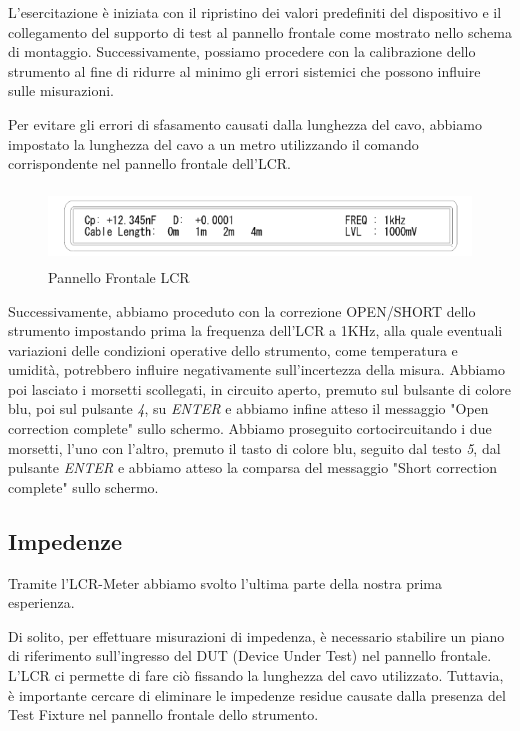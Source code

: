 L'esercitazione è iniziata con il ripristino dei valori predefiniti del dispositivo e il collegamento del supporto di test al pannello frontale come mostrato nello schema di montaggio. Successivamente, possiamo procedere con la calibrazione dello strumento al fine di ridurre al minimo gli errori sistemici che possono influire sulle misurazioni.

Per evitare gli errori di sfasamento causati dalla lunghezza del cavo, abbiamo impostato la lunghezza del cavo a un metro utilizzando il comando corrispondente nel pannello frontale dell'LCR.

\begin{figure}[ht]
    \centering
    \includegraphics[height=2cm]{media/pannello_frontale_LCR.png}
    \caption{Pannello Frontale LCR}
    \label{fig:pannello_frontale_LCR}
\end{figure}
\FloatBarrier

Successivamente, abbiamo proceduto con la correzione OPEN/SHORT dello strumento
impostando prima la frequenza dell'LCR a 1KHz, alla quale eventuali variazioni delle condizioni operative dello strumento, come temperatura e umidità, potrebbero influire negativamente sull'incertezza della misura. Abbiamo poi lasciato i morsetti scollegati, in circuito aperto, premuto sul bulsante di colore blu, poi sul pulsante \emph{4}, su \emph{ENTER} e abbiamo infine atteso il messaggio "Open correction complete" sullo schermo. Abbiamo proseguito cortocircuitando i due morsetti, l'uno con l'altro, premuto il tasto di colore blu, seguito dal testo \emph{5}, dal pulsante \emph{ENTER} e abbiamo atteso la comparsa del messaggio "Short correction complete" sullo schermo.
 

\subsection{Impedenze}
\label{sub:z}

Tramite l'LCR-Meter abbiamo svolto l'ultima parte della nostra prima esperienza.

Di solito, per effettuare misurazioni di impedenza, è necessario stabilire un piano di riferimento sull'ingresso del DUT (Device Under Test) nel pannello frontale. L'LCR ci permette di fare ciò fissando la lunghezza del cavo utilizzato. Tuttavia, è importante cercare di eliminare le impedenze residue causate dalla presenza del Test Fixture nel pannello frontale dello strumento.

